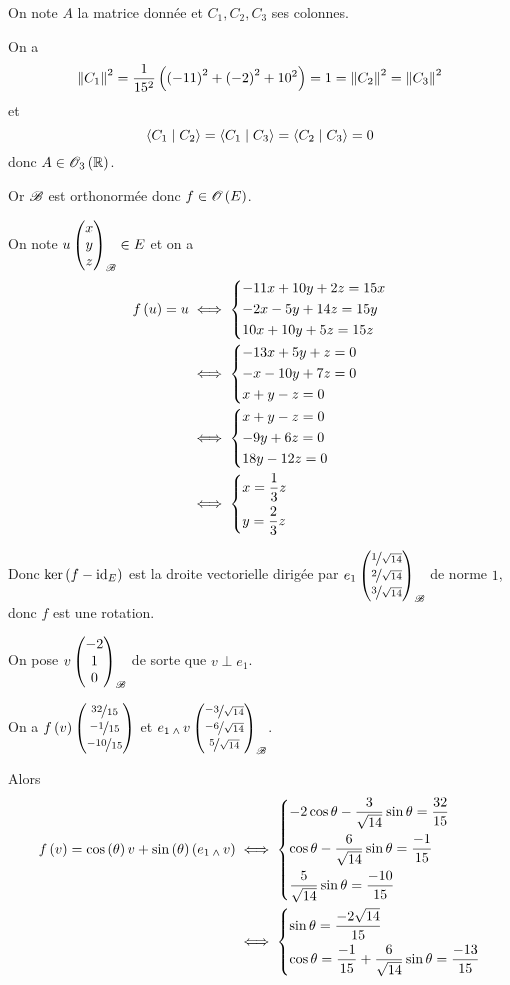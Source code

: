 \begin{corr}
On note \(A\) la matrice donnée et \(C_1,C_2,C_3\) ses colonnes.

On a \[\norme{C_1}^2=\dfrac{1}{15^2}\paren{\paren{-11}^2+\paren{-2}^2+10^2}=1=\norme{C_2}^2=\norme{C_3}^2\] et \[\ps{C_1}{C_2}=\ps{C_1}{C_3}=\ps{C_2}{C_3}=0\] donc \(A\in\Orth{3}[\R]\).

Or \(\mathscr{B}\) est orthonormée donc \(f\in\Orth{}[E]\).

On note \(u\begin{pmatrix}x\\y\\z\end{pmatrix}_{\mathscr{B}}\in E\) et on a \[\begin{aligned}
f\left(u\right)=u&\iff\begin{dcases}
-11x+10y+2z=15x \\
-2x-5y+14z=15y \\
10x+10y+5z=15z
\end{dcases} \\
&\iff\begin{dcases}
-13x+5y+z=0 \\
-x-10y+7z=0 \\
x+y-z=0
\end{dcases} \\
&\iff\begin{dcases}
x+y-z=0 \\
-9y+6z=0 \\
18y-12z=0
\end{dcases} \\
&\iff\begin{dcases}
x=\dfrac{1}{3}z \\
y=\dfrac{2}{3}z
\end{dcases}
\end{aligned}\]

Donc \(\ker\left(f-\mathrm{id}_{E}\right)\) est la droite vectorielle dirigée par \(e_1\begin{pmatrix}\nicefrac{1}{\sqrt{14}}\\\nicefrac{2}{\sqrt{14}}\\\nicefrac{3}{\sqrt{14}}\end{pmatrix}_{\mathscr{B}}\) de norme \(1\), donc \(f\) est une rotation.

On pose \(v\begin{pmatrix}-2\\1\\0\end{pmatrix}_{\mathscr{B}}\) de sorte que \(v\perp e_1\).

On a \(f\left(v\right)\begin{pmatrix}\nicefrac{32}{15}\\\nicefrac{-1}{15}\\\nicefrac{-10}{15}\end{pmatrix}\) et \(e_1\operatorname{_\wedge} v\begin{pmatrix}\nicefrac{-3}{\sqrt{14}}\\\nicefrac{-6}{\sqrt{14}}\\\nicefrac{5}{\sqrt{14}}\end{pmatrix}_{\mathscr{B}}\).

Alors \[\begin{aligned}
f\left(v\right)=\cos\left(\theta\right)v+\sin\left(\theta\right)\left(e_1\operatorname{_\wedge} v\right)&\iff\begin{dcases}
-2\cos\theta-\dfrac{3}{\sqrt{14}}\sin\theta=\dfrac{32}{15} \\
\cos\theta-\dfrac{6}{\sqrt{14}}\sin\theta=\dfrac{-1}{15} \\
\dfrac{5}{\sqrt{14}}\sin\theta=\dfrac{-10}{15}
\end{dcases} \\
&\iff\begin{dcases}
\sin\theta=\dfrac{-2\sqrt{14}}{15} \\
\cos\theta=\dfrac{-1}{15}+\dfrac{6}{\sqrt{14}}\sin\theta=\dfrac{-13}{15}
\end{dcases}
\end{aligned}\]


\end{corr}
